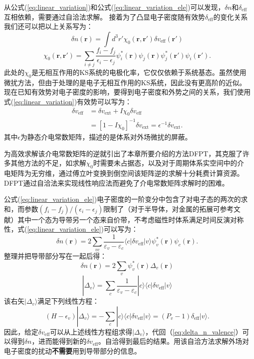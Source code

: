 从公式(\ref{eq:linear_variation})和公式(\ref{eq:linear_variation_ele})可以发现，$\delta n$和$\delta_\mathrm{eff}$互相依赖，需要通过自洽法求解。
接着为了凸显电子密度随有效势$\delta_\mathrm{eff}$的变化关系我们还可以把以上关系写为：
\begin{equation}
  \delta n(\bm{r}) = \int d^3 r' \chi_0 (\bm{r},\bm{r'})\delta v_\mathrm{eff}(\bm{r'})
\end{equation}
\begin{equation}
  \chi_0(\bm{r},\bm{r'}) = \sum_{i\neq j}\frac{f_i-f_j}{\epsilon_i-\epsilon_j} \psi^*_i(\bm{r})\psi_j(\bm{r})\psi^*_j(\bm{r'})\psi_i(\bm{r'}).
\end{equation}
此处的$\chi_0$是无相互作用的KS系统的电极化率，它仅仅依赖于系统基态。虽然使用微扰方法，但由于处理的是电子无相互作用的KS系统，因此没有更高阶的近似。
现在已知有效势对电子密度的影响，要得到电子密度和外势之间的关系，我们使用式(\ref{eq:linear_variation})有效势可以写为：
\begin{align}
  \delta v_\mathrm{eff} &= \delta v_\mathrm{ext} + I \chi_0 \delta v_\mathrm{eff} \\
  &= [1-I\chi_0]^{-1} \delta v_\mathrm{ext} = \epsilon^{-1} \delta v_\mathrm{ext}.
\end{align}
其中$\epsilon$为静态介电常数矩阵，描述的是体系对外场微扰的屏蔽。

为高效求解该介电常数矩阵的逆就引出了本章所要介绍的方法DFPT，其克服了许多其他方法的不足，如求解$\chi_0$时需要未占据态，以及对于周期体系实空间中的介电矩阵为无穷维，通过傅立叶变换到倒空间该矩阵逆的求解十分耗费计算资源。DFPT通过自洽法来实现线性响应法而避免了介电常数矩阵求解时的困难。

公式(\ref{eq:linear_variation_ele})电子密度的一阶变分中包含了对电子态的两次的求和，而参数$(f_i-f_j)/(\epsilon_i-\epsilon_j)$限制了（对于半导体，对金属的拓展可参考文献\cite{de1995lattice}）其中一个态为导带另一个态来自价带，不考虑磁性时体系满足时间反演对称性，式(\ref{eq:linear_variation_ele})可以写为：
\begin{equation}
  \delta n(\bm{r}) = 2\sum_{vc}\frac{1}{\varepsilon_v-\varepsilon_c}
  \langle c| \delta v_\mathrm{eff} | v\rangle \psi^*_v(\bm{r})\psi_c(\bm{r}).
\end{equation}
整理并把导带部分写在一起后得：
\begin{equation}\label{eq:delta_n_valence}
  \delta n(\bm{r}) = 2\sum_v \psi^*_v(\bm{r}) \Delta_v(\bm{r})
\end{equation}
\begin{equation}
  |\Delta_v \rangle = \sum_{c}\frac{1}{\varepsilon_v-\varepsilon_c}
  |c\rangle \langle c| \delta v_\mathrm{eff} | v\rangle
\end{equation}
该右矢$|\Delta_v\rangle$满足下列线性方程：
\begin{equation}
  (H-\epsilon_v)|\Delta_v\rangle = -\sum_c |c\rangle \langle c| \delta v_\mathrm{eff} | v\rangle = (P_v-1)\delta_\mathrm{eff}|v\rangle .
\end{equation}
因此，给定$\delta v_\mathrm{eff}$可以从上述线性方程组求得$|\Delta_v\rangle$，代回（\ref{eq:delta_n_valence}）可以得到$\delta n$，进而能得到新的$\delta v_\mathrm{eff}$。自洽得到最后的结果。用该自洽方法求解外场对电子密度的扰动{\textbf{不需要}}用到导带部分的信息。

